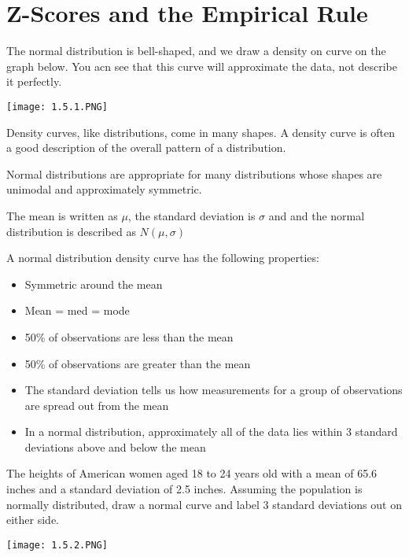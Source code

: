 \documentclass[../stats.tex]{subfiles}
\begin{document}
\section{Z-Scores and the Empirical Rule}
The normal distribution is bell-shaped, and we draw a density on curve on the graph below. You acn see that this curve will approximate the data, not describe it perfectly.
\begin{center}
    \texttt{[image: 1.5.1.PNG]}
\end{center}
Density curves, like distributions, come in many shapes. A density curve is often a good description of the overall pattern of a distribution.

Normal distributions are appropriate for many distributions whose shapes are unimodal and approximately symmetric.

The mean is written as $\mu$, the standard deviation is $\sigma$ and and the normal distribution is described as $N(\mu,\sigma)$

A normal distribution density curve has the following properties:
\begin{itemize}
    \item Symmetric around the mean 
    \item Mean = med = mode 
    \item 50\% of observations are less than the mean 
    \item 50\% of observations are greater than the mean 
    \item The standard deviation tells us how measurements for a group of observations are spread out from the mean 
    \item In a normal distribution, approximately all of the data lies within 3 standard deviations above and below the mean 
\end{itemize}

\pagebreak
\begin{example}
    The heights of American women aged 18 to 24 years old with a mean of 65.6 inches and a standard deviation of 2.5 inches. Assuming the population is normally distributed, draw a normal curve and label 3 standard deviations out on either side.
    \begin{center}
        \texttt{[image: 1.5.2.PNG]}
    \end{center}
\end{example}
\end{document}
